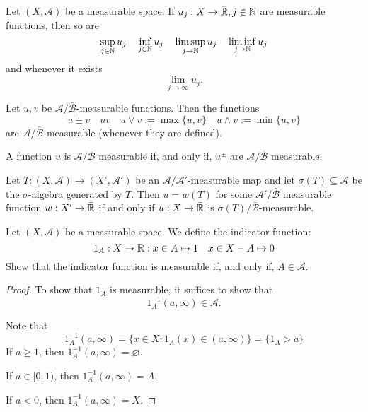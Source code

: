 \begin{thm}
Let \((X,\mathcal{A})\) be a measurable space. If \(u_{j}:X\rightarrow \bar{\Bbb{R}}, j\in \Bbb{N}\) are measurable functions, then so are
\[
\sup_{j\in \Bbb{N}}u_{j} \quad \inf_{j\in \Bbb{N}}u_{j} \quad \limsup_{j\rightarrow \Bbb{N}}u_{j}\quad \liminf_{j\rightarrow \Bbb{N}}u_{j}
\]
and whenever it exists
\[
\lim_{j\rightarrow \infty }u_{j}.
\]
\end{thm}

\begin{thm}
Let \(u,v\) be \(\mathcal{A}/\bar{\mathcal{B}}\)-measurable functions. Then the functions
\[
u\pm v \quad uv\quad u\vee v:=\max\{u,v\}\quad u\wedge v:=\min\{u,v\}
\]
are \(\mathcal{A}/\bar{\mathcal{B}}\)-measurable (whenever they are defined).
\end{thm}

\begin{thm}
A function \(u\) is \(\mathcal{A}/\mathcal{B}\) measurable if, and only if, \(u^\pm \) are \(\mathcal{A}/\bar{\mathcal{B}}\) measurable.
\end{thm}

\begin{thm}
Let \(T:(X,\mathcal{A})\rightarrow (X',\mathcal{A}')\) be an \(\mathcal{A}/\mathcal{A}'\)-measurable map and let \(\sigma (T)\subseteq \mathcal{A}\) be the \(\sigma \)-algebra generated by \(T\). Then \(u=w(T)\) for some \(\mathcal{A}'/\bar{\mathcal{B}}\) measurable function \(w:X'\rightarrow \bar{\Bbb{R}}\) if and only if
\(u:X\rightarrow \bar{\Bbb{R}}\) is \(\sigma (T)/\bar{\mathcal{B}}\)-measurable.
\end{thm}

\begin{prop}
Let \((X,\mathcal{A})\) be a measurable space. We define the indicator function:
\[
1_A : X\rightarrow  \Bbb{R} : x\in A \mapsto 1 \quad  x\in X-A\mapsto 0
\]
Show that the indicator function is measurable if, and only if, \(A\in \mathcal{A}.\)
\end{prop}

\begin{proof}
To show that \(1_A\) is measurable, it suffices to show that
\[
1_A^{-1}(a,\infty )\in \mathcal{A}.
\]

Note that
\[
1_A^{-1}(a,\infty )=\{x\in X:1_A(x)\in (a,\infty )\}=\{1_A >a\}
\]
If \(a\geq 1\), then \(1_A^{-1}(a,\infty )=\varnothing \).

If \(a\in [0,1)\), then  \(1_A^{-1}(a,\infty )=A.\)

If \(a<0\), then \(1_A^{-1}(a,\infty )=X\).
\end{proof}

